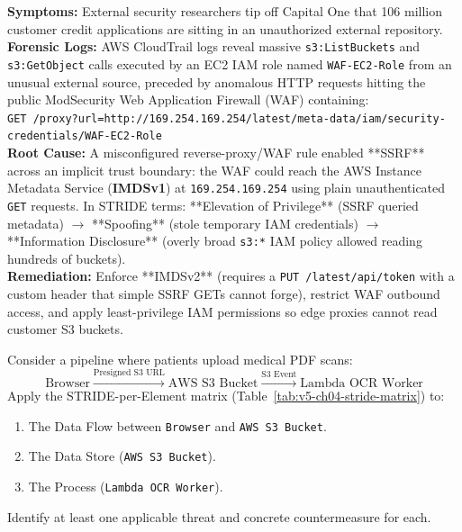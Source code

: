 \begin{realworldbox}
\textbf{Symptoms:} External security researchers tip off Capital One that 106 million customer credit applications are sitting in an unauthorized external repository.\\
\textbf{Forensic Logs:} AWS CloudTrail logs reveal massive \texttt{s3:ListBuckets} and \texttt{s3:GetObject} calls executed by an EC2 IAM role named \texttt{WAF-EC2-Role} from an unusual external source, preceded by anomalous HTTP requests hitting the public ModSecurity Web Application Firewall (WAF) containing:\\
\texttt{GET /proxy?url=http://169.254.169.254/latest/meta-data/iam/security-credentials/WAF-EC2-Role}\\
\textbf{Root Cause:} A misconfigured reverse-proxy/WAF rule enabled **SSRF** across an implicit trust boundary: the WAF could reach the AWS Instance Metadata Service (\textbf{IMDSv1}) at \texttt{169.254.169.254} using plain unauthenticated \texttt{GET} requests. In STRIDE terms: **Elevation of Privilege** (SSRF queried metadata) $\rightarrow$ **Spoofing** (stole temporary IAM credentials) $\rightarrow$ **Information Disclosure** (overly broad \texttt{s3:*} IAM policy allowed reading hundreds of buckets).\\
\textbf{Remediation:} Enforce **IMDSv2** (requires a \texttt{PUT /latest/api/token} with a custom header that simple SSRF GETs cannot forge), restrict WAF outbound access, and apply least-privilege IAM permissions so edge proxies cannot read customer S3 buckets.
\end{realworldbox}

\begin{tryityourselfbox}
Consider a pipeline where patients upload medical PDF scans:
$$\text{Browser} \xrightarrow{\text{Presigned S3 URL}} \text{AWS S3 Bucket} \xrightarrow{\text{S3 Event}} \text{Lambda OCR Worker}$$
Apply the STRIDE-per-Element matrix (Table~\ref{tab:v5-ch04-stride-matrix}) to:
\begin{enumerate}
  \item The Data Flow between \texttt{Browser} and \texttt{AWS S3 Bucket}.
  \item The Data Store (\texttt{AWS S3 Bucket}).
  \item The Process (\texttt{Lambda OCR Worker}).
\end{enumerate}
Identify at least one applicable threat and concrete countermeasure for each.
\end{tryityourselfbox}

